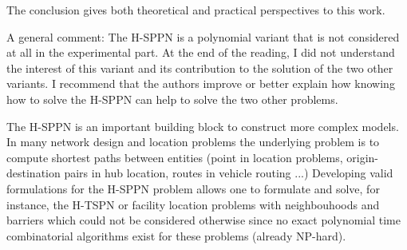 \documentclass{article}
\newenvironment{reviewer}{\setcounter{pointcounter}{1}}{}
\newcommand{\point}{\text{{\selectfont \thepointcounter} \stepcounter{pointcounter}}}
\begin{document}
\begin{reviewer}
		\begin{itshape}
			The conclusion gives both theoretical and practical perspectives to this work.
		\end{itshape}
		
		\begin{itshape}
			A general comment: The H-SPPN is a polynomial variant that is not considered at all in the experimental part. At the end of the reading, I did not understand the interest of this variant and its contribution to the solution of the two other variants. I recommend that the authors improve or better explain how knowing how to solve the H-SPPN can help to solve the two other problems.
		\end{itshape}
		
		\begin{tcolorbox}[breakable,enhanced,coltitle=black,colback=green!5!white,colframe=green!75!black,title=\textbf{Answer R2.\point},borderline={1pt}{0pt}{black},boxrule=0pt]
			The H-SPPN is an important building block to construct more complex models. In many network design and location problems the underlying problem is to compute shortest paths between entities (point in location problems, origin-destination pairs in hub location, routes in vehicle routing ...)
 Developing valid formulations for the H-SPPN problem allows one to formulate and solve, for instance, the H-TSPN or facility location problems with neighbouhoods and barriers which could not be considered otherwise since no exact polynomial time combinatorial algorithms exist for these problems (already NP-hard).
 		\end{tcolorbox}
		
	\end{reviewer}
	
	
	
	
	
\end{document}

